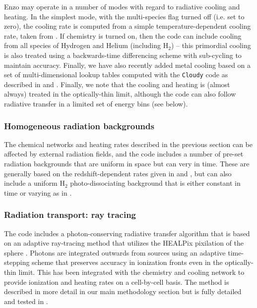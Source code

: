 Enzo may operate in a number of modes with regard to radiative cooling
and heating.  In the simplest mode, with the multi-species flag turned
off (i.e. set to zero), the cooling rate is computed from a simple
temperature-dependent cooling rate, taken from \citet{SW87}.  If
chemistry is turned on, then the code can include cooling from all
species of Hydrogen and Helium (including H$_2$) -- this primordial cooling is
also treated using a backwards-time differencing scheme with
sub-cycling to maintain accuracy.  Finally, we have also recently
added metal cooling based on a set of multi-dimensional lookup tables
computed with the \texttt{Cloudy} code \citep{1998PASP..110..761F} as
described in \citet{2008MNRAS.385.1443S} and
\citet{2011ApJ...731....6S}.  Finally, we note that the cooling and
heating is (almost always) treated in the optically-thin limit,
although the code can also follow radiative transfer in a limited set
of energy bins (see below).

\subsubsection{Homogeneous radiation backgrounds}

The chemical networks and heating rates described in the previous
section can be affected by external radiation fields, and the code
includes a number of pre-set radiation backgrounds that are uniform in
space but can very in time.  These are generally based on the
redshift-dependent rates given in \citet{1996ApJ...461...20H} and
\citet{2012ApJ...746..125H}, but can also include a uniform H$_2$
photo-dissociating background that is either constant in time or
varying as in \citet{WiseAbel05}.

\subsubsection{Radiation transport: ray tracing}

The code includes a photon-conserving radiative transfer algorithm
that is based on an adaptive ray-tracing method that utilizes the
HEALPix pixilation of the sphere \citep{AbelWandelt02}.  Photons are
integrated outwards from sources using an adaptive time-stepping
scheme that preserves accuracy in ionization fronts even in the
optically-thin limit.  This has been integrated with the chemistry and
cooling network to provide ionization and heating rates on a
cell-by-cell basis.  The method is described in more detail in our
main methodology section but is fully detailed and tested in
\citet{Wise11_Moray}.

